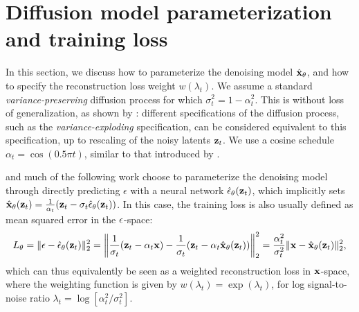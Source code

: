 \documentclass[hidelinks]{article} %
\begin{document}
\section{Diffusion model parameterization and training loss}
\label{sec:param_and_loss}
In this section, we discuss how to parameterize the denoising model $\hat{\mathbf{x}}_\theta$, and how to specify the reconstruction loss weight $w(\lambda_t)$. We assume a standard \emph{variance-preserving} diffusion process for which $\sigma^{2}_t = 1 - \alpha^{2}_t$. This is without loss of generalization, as shown by \cite[appendix G]{kingma2021variational}: different specifications of the diffusion process, such as the \emph{variance-exploding} specification, can be considered equivalent to this specification, up to rescaling of the noisy latents ${\mathbf{z}}_t$. We use a cosine schedule $\alpha_t = \cos(0.5\pi t)$, similar to that introduced by \cite{nichol2021improvedddpm}.

\cite{ho2020denoising} and much of the following work choose to parameterize the denoising model through directly predicting $\epsilon$ with a neural network $\hat{{\mathbf{\epsilon}}}_{\theta}({\mathbf{z}}_t)$, which implicitly sets $\hat{{\mathbf{x}}}_{\theta}({\mathbf{z}}_t) = \frac{1}{\alpha_t}({\mathbf{z}}_t - \sigma_t\hat{{\mathbf{\epsilon}}}_{\theta}({\mathbf{z}}_t))$. In this case, the training loss is also usually defined as mean squared error in the ${\mathbf{\epsilon}}$-space:
\begin{align}
L_{\theta} = \lVert \epsilon - \hat{{\mathbf{\epsilon}}}_{\theta}({\mathbf{z}}_t)\rVert_{2}^{2} = \left\| \frac{1}{\sigma_t}({\mathbf{z}}_t - \alpha_t{\mathbf{x}}) - \frac{1}{\sigma_t}({\mathbf{z}}_t - \alpha_t\hat{{\mathbf{x}}}_{\theta}({\mathbf{z}}_t))\right\|_{2}^{2} = \frac{\alpha^{2}_t}{\sigma^{2}_t} \lVert {\mathbf{x}} - \hat{{\mathbf{x}}}_{\theta}({\mathbf{z}}_t) \rVert_{2}^{2},
\label{eq:loss}
\end{align}
which can thus equivalently be seen as a weighted reconstruction loss in ${\mathbf{x}}$-space, where the weighting function is given by $w(\lambda_t)=\exp(\lambda_t)$, for log signal-to-noise ratio $\lambda_t = \log[\alpha^2_t/\sigma^{2}_t]$.
\end{document}
